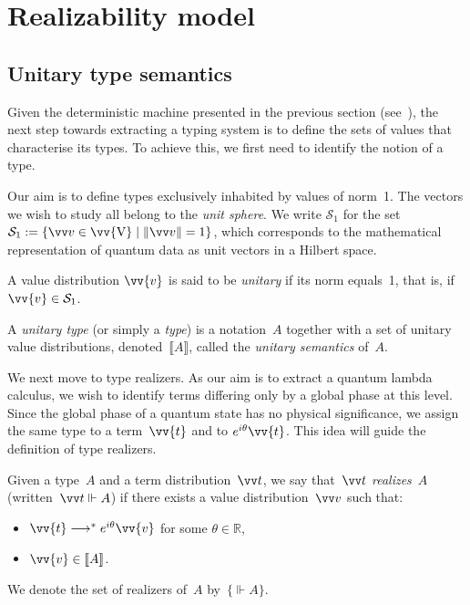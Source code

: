 \documentclass[runningheads,orivec,envcountsame,envcountsect]{llncs}
\newcommand\s[1]{\ensuremath{\mathsf{#1}}}
\newcommand\Val{{\s V}}
\newcommand\lra{\longrightarrow}
\def\R{\mathbb{R}}            %
\def\Val{\mathrm{V}}          %
\def\Sph{\mathcal{S}_1}       %
\def\eval{\lra^*}
\def\sem#1{\llbracket#1\rrbracket}
\def\real{\Vdash}
\begin{document}
\section{Realizability model}\label{sec:model}

\subsection{Unitary type semantics}
Given the deterministic machine presented in the previous section
(see~), the next
step towards extracting a typing system is to define the sets of values that
characterise its types. To achieve this, we first need to identify the notion
of a type.

Our aim is to define types exclusively inhabited by values of norm~1. The
vectors we wish to study all belong to the \emph{unit sphere}. We write $\Sph$
for the set $\Sph := \{\vv v \in \vv{\Val} \mid \|\vv v\| = 1\}$, which
corresponds to the mathematical representation of quantum data as unit vectors
in a Hilbert space.

\begin{definition}
  A value distribution $\vv{v}$ is said to be \emph{unitary} if its norm equals~1,
  that is, if $\vv{v}\in\Sph$.
\end{definition}

\begin{definition}
  A \emph{unitary type} (or simply a \emph{type}) is a notation~$A$ together
  with a set of unitary value distributions, denoted~$\sem{A}$, called the
  \emph{unitary semantics} of~$A$.
\end{definition}


We next move to type realizers. As our aim is to extract a quantum
lambda calculus, we wish to identify terms differing only by a global phase at
this level. Since the global phase of a quantum state has no physical
significance, we assign the same type to a term~$\vv{t}$ and to
$e^{i\theta}\vv{t}$. This idea will guide the definition of type
realizers.

\begin{definition}
  Given a type~$A$ and a term distribution~$\vv t$, we say that~$\vv t$
  \emph{realizes}~$A$ (written~$\vv t \real A$) if there exists a value
  distribution~$\vv v$ such that:
  \begin{itemize}
    \item $\vv{t}\eval e^{i\theta}\vv{v}$ for some $\theta\in\R$,
    \item $\vv{v}\in\sem{A}$.
  \end{itemize}
  We denote the set of realizers of~$A$ by~$\{\real A\}$.
\end{definition}
\end{document}
